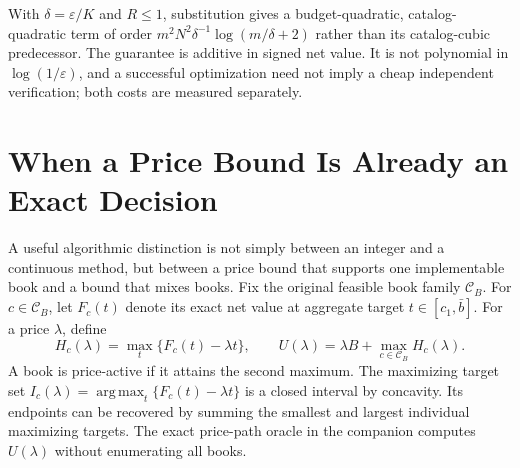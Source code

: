 \documentclass[11pt,letterpaper]{article}
\theoremstyle{definition}\newtheorem{remark}[theorem]{Remark}
\newcommand{\argmax}{\operatorname*{arg\,max}}
\begin{document}
With $\delta=\varepsilon/K$ and $R\leq1$, substitution gives a budget-quadratic, catalog-quadratic term of order $m^2N^2\delta^{-1}\log(m/\delta+2)$ rather than its catalog-cubic predecessor. The guarantee is additive in signed net value. It is not polynomial in $\log(1/\varepsilon)$, and a successful optimization need not imply a cheap independent verification; both costs are measured separately.
\section{When a Price Bound Is Already an Exact Decision}\label{sec:pricebridge60}
A useful algorithmic distinction is not simply between an integer and a continuous method, but between a price bound that supports one implementable book and a bound that mixes books. Fix the original feasible book family $\mathcal C_B$. For $c\in\mathcal C_B$, let $F_c(t)$ denote its exact net value at aggregate target $t\in[c_1,\bar b]$. For a price $\lambda$, define
\[
 H_c(\lambda)=\max_t\{F_c(t)-\lambda t\},\qquad
 U(\lambda)=\lambda B+\max_{c\in\mathcal C_B}H_c(\lambda).
\]
A book is price-active if it attains the second maximum. The maximizing target set $I_c(\lambda)=\argmax_t\{F_c(t)-\lambda t\}$ is a closed interval by concavity. Its endpoints can be recovered by summing the smallest and largest individual maximizing targets. The exact price-path oracle in the companion computes $U(\lambda)$ without enumerating all books.
\end{document}
